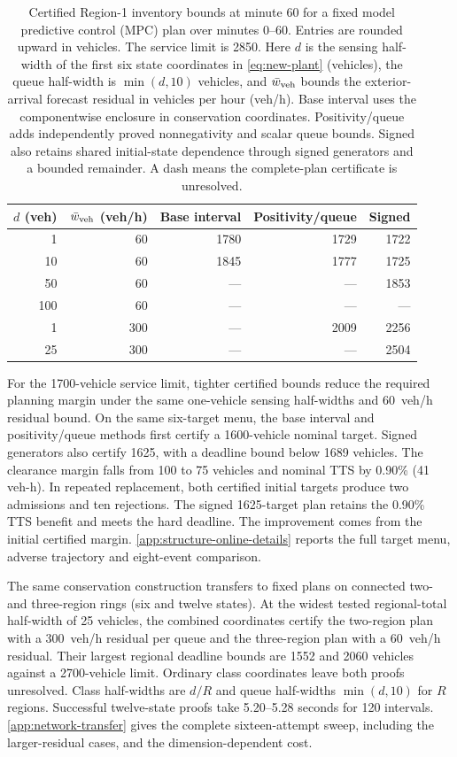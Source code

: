 \documentclass[preprint,12pt]{elsarticle}
\newcommand{\appref}[1]{\ref{#1}}
\begin{document}
\begin{table}[t]
\centering\small
\caption{Certified Region-1 inventory bounds at minute 60 for a fixed
model predictive control (MPC) plan over minutes 0--60. Entries are rounded
upward in vehicles. The service limit is 2850. Here $d$ is the sensing
half-width of the first six state coordinates in \eqref{eq:new-plant}
(vehicles), the queue half-width is
$\min(d,10)$ vehicles, and $\bar w_{\rm veh}$ bounds the exterior-arrival
forecast residual in vehicles per hour (veh/h). Base interval uses the
componentwise enclosure in conservation coordinates. Positivity/queue adds
independently proved nonnegativity and scalar queue bounds. Signed also retains
shared initial-state dependence through signed generators and a bounded
remainder. A dash means the complete-plan certificate is unresolved.}
\label{tab:structure-frontier}
\setlength{\tabcolsep}{5pt}
\begin{tabular}{@{}rrrrr@{}}
\toprule
$d$ (veh) & $\bar w_{\rm veh}$ (veh/h) & Base interval & Positivity/queue & Signed\\
\midrule
1 & 60 & 1780 & 1729 & 1722\\
10 & 60 & 1845 & 1777 & 1725\\
50 & 60 & --- & --- & 1853\\
100 & 60 & --- & --- & ---\\
1 & 300 & --- & 2009 & 2256\\
25 & 300 & --- & --- & 2504\\
\bottomrule
\end{tabular}
\end{table}

For the 1700-vehicle service limit, tighter certified bounds reduce the
required planning margin under the same one-vehicle sensing half-widths
and 60~veh/h residual bound. On the same six-target menu, the base interval and
positivity/queue methods first certify a 1600-vehicle nominal target. Signed
generators also certify 1625, with a deadline bound below 1689 vehicles.
The clearance margin falls from 100 to 75 vehicles and nominal TTS by
0.90\% (41 veh-h). In repeated replacement, both certified initial targets
produce two admissions and ten rejections. The signed 1625-target plan
retains the 0.90\% TTS benefit and meets the hard deadline. The improvement
comes from the initial certified margin. \appref{app:structure-online-details}
reports the full target menu, adverse trajectory and eight-event comparison.

The same conservation construction transfers to fixed plans on connected
two- and three-region rings (six and twelve states). At the widest tested
regional-total half-width of 25 vehicles, the combined coordinates certify
the two-region plan with a 300~veh/h residual per queue and the
three-region plan with a 60~veh/h residual. Their largest regional
deadline bounds are 1552 and 2060 vehicles against a 2700-vehicle limit.
Ordinary class coordinates leave both proofs unresolved. Class half-widths
are $d/R$ and queue half-widths $\min(d,10)$ for $R$ regions. Successful
twelve-state proofs take 5.20--5.28 seconds for 120 intervals.
\appref{app:network-transfer} gives the complete sixteen-attempt sweep,
including the larger-residual cases, and the dimension-dependent cost.
\end{document}
